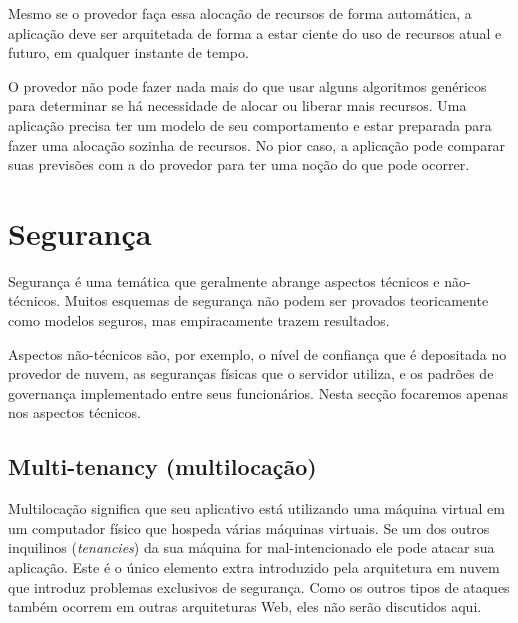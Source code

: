 Mesmo se o provedor faça essa alocação de recursos de forma automática, a aplicação deve ser arquitetada de forma a estar ciente do uso de recursos atual e futuro, em qualquer instante de tempo. 

O provedor não pode fazer nada mais do que usar alguns algoritmos genéricos para determinar se há necessidade de alocar ou liberar mais recursos. Uma aplicação precisa ter um modelo de seu comportamento e estar preparada para fazer uma alocação sozinha de recursos. No pior caso, a aplicação pode comparar suas previsões com a do provedor para ter uma noção do que pode ocorrer.


\section{Segurança}
Segurança é uma temática que geralmente abrange aspectos técnicos e não-técnicos. Muitos esquemas de segurança não podem ser provados teoricamente como modelos seguros, mas empiracamente trazem resultados.

Aspectos não-técnicos são, por exemplo, o nível de confiança que é depositada no provedor de nuvem, as seguranças físicas que o servidor utiliza, e os padrões de governança implementado entre seus funcionários. Nesta secção focaremos apenas nos aspectos técnicos.

\subsection{Multi-tenancy (multilocação)}
Multilocação significa que seu aplicativo está utilizando uma máquina virtual em um computador físico que hospeda várias máquinas virtuais. Se um dos outros inquilinos (\textit{tenancies}) da sua máquina for mal-intencionado ele pode atacar sua aplicação.
Este é o único elemento extra introduzido pela arquitetura em nuvem que introduz problemas exclusivos de segurança. Como os outros tipos de ataques também ocorrem em outras arquiteturas Web, eles não serão discutidos aqui.

